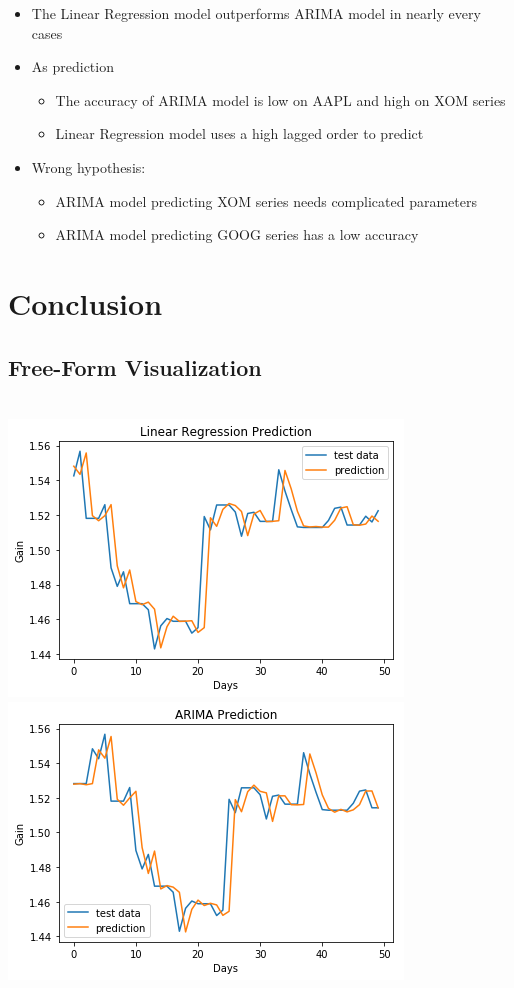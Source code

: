 \documentclass[11pt]{article}
\makeatletter
\def\maxwidth{\ifdim\Gin@nat@width>\linewidth\linewidth
    \else\Gin@nat@width\fi}
\let\Oldincludegraphics\includegraphics
\renewcommand{\includegraphics}[1]{\Oldincludegraphics[width=.8\maxwidth]{#1}}
\providecommand{\tightlist}{%
      \setlength{\itemsep}{0pt}\setlength{\parskip}{0pt}}
\makeatother
\begin{document}
\begin{itemize}
\tightlist
\item
  The Linear Regression model outperforms ARIMA model in nearly every
  cases
\item
  As prediction

  \begin{itemize}
  \tightlist
  \item
    The accuracy of ARIMA model is low on AAPL and high on XOM series
  \item
    Linear Regression model uses a high lagged order to predict
  \end{itemize}
\item
  Wrong hypothesis:

  \begin{itemize}
  \tightlist
  \item
    ARIMA model predicting XOM series needs complicated parameters
  \item
    ARIMA model predicting GOOG series has a low accuracy
  \end{itemize}
\end{itemize}

\section{Conclusion}\label{conclusion}

\subsection{Free-Form Visualization}\label{free-form-visualization} \\

\includegraphics{./figures/28.jpg} \includegraphics{./figures/29.jpg}
\end{document}
